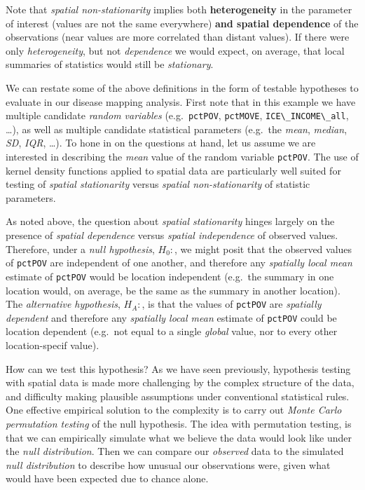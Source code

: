 \documentclass[
]{book}
\newcommand{\passthrough}[1]{#1}
\begin{document}
Note that \emph{spatial non-stationarity} implies both \textbf{heterogeneity} in the parameter of interest (values are not the same everywhere) \textbf{and spatial dependence} of the observations (near values are more correlated than distant values). If there were only \emph{heterogeneity}, but not \emph{dependence} we would expect, on average, that local summaries of statistics would still be \emph{stationary}.

We can restate some of the above definitions in the form of testable hypotheses to evaluate in our disease mapping analysis. First note that in this example we have multiple candidate \emph{random variables} (e.g.~\passthrough{\lstinline!pctPOV!}, \passthrough{\lstinline!pctMOVE!}, \passthrough{\lstinline!ICE\_INCOME\_all!}, \ldots), as well as multiple candidate statistical parameters (e.g.~the \emph{mean}, \emph{median}, \emph{SD}, \emph{IQR}, \ldots). To hone in on the questions at hand, let us assume we are interested in describing the \emph{mean} value of the random variable \passthrough{\lstinline!pctPOV!}. The use of kernel density functions applied to spatial data are particularly well suited for testing of \emph{spatial stationarity} versus \emph{spatial non-stationarity} of statistic parameters.

As noted above, the question about \emph{spatial stationarity} hinges largely on the presence of \emph{spatial dependence} versus \emph{spatial independence} of observed values. Therefore, under a \emph{null hypothesis}, \(H_0:\), we might posit that the observed values of \passthrough{\lstinline!pctPOV!} are independent of one another, and therefore any \emph{spatially local mean} estimate of \passthrough{\lstinline!pctPOV!} would be location independent (e.g.~the summary in one location would, on average, be the same as the summary in another location). The \emph{alternative hypothesis}, \(H_A:\), is that the values of \passthrough{\lstinline!pctPOV!} are \emph{spatially dependent} and therefore any \emph{spatially local mean} estimate of \passthrough{\lstinline!pctPOV!} could be location dependent (e.g.~not equal to a single \emph{global} value, nor to every other location-specif value).

How can we test this hypothesis? As we have seen previously, hypothesis testing with spatial data is made more challenging by the complex structure of the data, and difficulty making plausible assumptions under conventional statistical rules. One effective empirical solution to the complexity is to carry out \emph{Monte Carlo permutation testing} of the null hypothesis. The idea with permutation testing, is that we can empirically simulate what we believe the data would look like under the \emph{null distribution}. Then we can compare our \emph{observed} data to the simulated \emph{null distribution} to describe how unusual our observations were, given what would have been expected due to chance alone.
\end{document}
